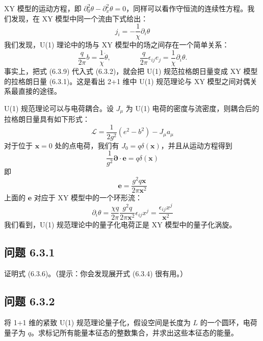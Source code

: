 XY 模型的运动方程，即 $\partial_{0}^{2}\theta-\partial_{x}^{2}\theta=0$，同样可以看作守恒流的连续性方程。我们发现，在 XY 模型中同一个流由下式给出：
\begin{equation*}
j_{i}=-\frac{1}{\chi}\partial_{i}\theta
\end{equation*}
我们发现，U(1) 理论中的场与 XY 模型中的场之间存在一个简单关系：
\begin{equation*}
\frac{q}{2\pi}b=\frac{1}{\chi}\dot{\theta}, \qquad\qquad \frac{q}{2\pi}\epsilon_{ij}e_{j}=\frac{1}{\chi}\partial_{i}\theta. \tag{6.3.9}
\end{equation*}
事实上，把式 (6.3.9) 代入式 (6.3.2)，就会把 U(1) 规范拉格朗日量变成 XY 模型的拉格朗日量 (6.3.1)。这是看出 2+1 维中 U(1) 规范理论与 XY 模型之间对偶关系最直接的途径。

U(1) 规范理论可以与电荷耦合。设 $J_{\mu}$ 为 U(1) 电荷的密度与流密度，则耦合后的拉格朗日量具有如下形式：
\begin{equation*}
\mathcal{L}=\frac{1}{2g^{2}}(e^{2}-b^{2})-J_{\mu}a_{\mu}
\end{equation*}
对于位于 $\pmb{x}=0$ 处的点电荷，我们有 $J_{0}=q\delta(\pmb{x})$，并且从运动方程得到
\begin{equation*}
\frac{1}{g^{2}}\pmb{\partial}\cdot\pmb{e}=q\delta(\pmb{x})
\end{equation*}
即
\begin{equation*}
\pmb{e}=\frac{g^{2}q\pmb{x}}{2\pi\pmb{x}^{2}}
\end{equation*}
上面的 $\pmb{e}$ 对应于 XY 模型中的一个环形流：
\begin{equation*}
\partial_{i}\theta=\frac{\chi q}{2\pi}\frac{g^{2}q}{2\pi\pmb{x}^{2}}\epsilon_{ij}x^{j}=\frac{\epsilon_{ij}x^{j}}{\pmb{x}^{2}}
\end{equation*}
我们看到，U(1) 规范理论中的量子化电荷正是 XY 模型中的量子化涡旋。

\subsection*{问题 6.3.1}

证明式 (6.3.6)。（提示：你会发现展开式 (6.3.4) 很有用。）

\subsection*{问题 6.3.2}

将 1+1 维的紧致 U(1) 规范理论量子化，假设空间是长度为 $L$ 的一个圆环，电荷量子为 $q$。求标记所有能量本征态的整数集合，并求出这些本征态的能量。

